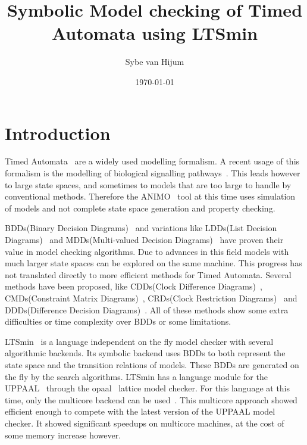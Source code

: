 \documentclass[11pt]{article}
\begin{document}
\newtheorem{mydef}{Definition}
\title{Symbolic Model checking of Timed Automata using LTSmin}
\author{Sybe van Hijum}
\date{\today}
\maketitle

\tableofcontents

\section{Introduction}
Timed Automata~\cite{Alur1994183} are a widely used modelling formalism. A recent usage of this formalism is the modelling of biological signalling pathways~\cite{DBLP:conf/bibe/SchivoSWCVKLPP12}. This leads however to large state spaces, and sometimes to models that are too large to handle by conventional methods. Therefore the ANIMO~\cite{DBLP:conf/bibe/SchivoSWCVKLPP12} tool at this time uses simulation of models and not complete state space generation and property checking.

BDDs(Binary Decision Diagrams)~\cite{?} and variations like LDDs(List Decision Diagrams)~\cite{so62465} and MDDs(Multi-valued Decision Diagrams)~\cite{129849} have proven their value in model checking algorithms. Due to advances in this field models with much larger state spaces can be explored on the same machine. This progress has not translated directly to more efficient methods for Timed Automata. Several methods have been proposed, like CDDs(Clock Difference Diagrams)~\cite{BRICS19491}, CMDs(Constraint Matrix Diagrams)~\cite{5702245}, CRDs(Clock Restriction Diagrams)~\cite{crds} and DDDs(Difference Decision Diagrams)~\cite{ddds}. All of these methods show some extra difficulties or time complexity over BDDs or some limitations.

LTSmin~\cite{eemcs18152,ltsmin-mc:nmf2011} is a language independent on the fly model checker with several algorithmic backends. Its symbolic backend uses BDDs to both represent the state space and the transition relations of models. These BDDs are generated on the fly by the search algorithms. LTSmin has a language module for the UPPAAL~\cite{UPPAAL} through the opaal~\cite{opaal} lattice model checker. For this language at this time, only the multicore backend can be used~\cite{eemcs21972}. This multicore approach showed efficient enough to compete with the latest version of the UPPAAL model checker. It showed significant speedups on multicore machines, at the cost of some memory increase however.
\end{document}
